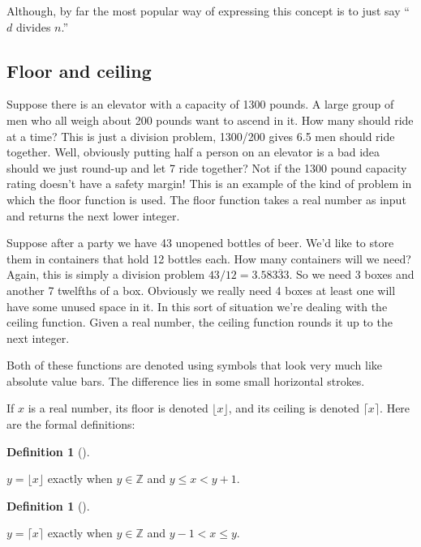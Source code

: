 \documentclass[10pt,]{book}
\theoremstyle{plain}
\theoremstyle{definition}
\newtheorem{definition}[theorem]{Definition}
\theoremstyle{definition}
\numberwithin{equation}{section}
\newcommand{\Integers}{{\mathbb Z}}
\newcommand{\lt}{ < }
\begin{document}
\par

      Although, by far the most popular way of expressing this concept is to just say ``\(d\) divides \(n\).''
\typeout{************************************************}
\typeout{************************************************}
\subsection[{Floor and ceiling}]{Floor and ceiling}\label{floor}

      Suppose there is an elevator with a capacity of 1300 pounds. A large
      group of men who all weigh about 200 pounds want to ascend in it. How
      many should ride at a time? This is just a division problem, 1300/200
      gives 6.5 men should ride together. Well, obviously putting half a
      person on an elevator is a bad idea \textemdash{} should we just round-up and
      let 7 ride together? Not if the 1300 pound capacity rating doesn't
      have a safety margin! This is an example of the kind of problem
      in which the floor function is used. The 
      floor function takes a real number as input and returns the next
      lower integer.
\par

      Suppose after a party we have 43 unopened bottles of beer. We'd like
      to store them in containers that hold 12 bottles each. How many
      containers will we need? Again, this is simply a division problem \textemdash{} \(43/12 = 3.58\overline{333}\). So we need 3 boxes and another
      7 twelfths of a box. Obviously we really need 4 boxes \textemdash{} at least one
      will have some unused space in it. In this sort of situation
      we're dealing with the ceiling function.
      Given a real number, the ceiling function rounds it up to the
      next integer.
\par

      Both of these functions are denoted using symbols that look very
      much like absolute value bars. The difference lies in some
      small horizontal strokes.
\par

      If \(x\) is a real number, its floor is denoted \(\lfloor x \rfloor\),
      and its ceiling is denoted \(\lceil x \rceil\). Here are the
      formal definitions:
\begin{definition}[{}]\label{definition-6}

          \(y = \lfloor x \rfloor\) exactly when \(y \in \Integers\) and
          \(y \leq x \lt  y+1\).
\end{definition}
\begin{definition}[{}]\label{definition-7}

          \(y = \lceil x \rceil\) exactly when \(y \in \Integers\) and
          \(y-1 \lt  x \leq y\).
\end{definition}
\par
\end{document}
